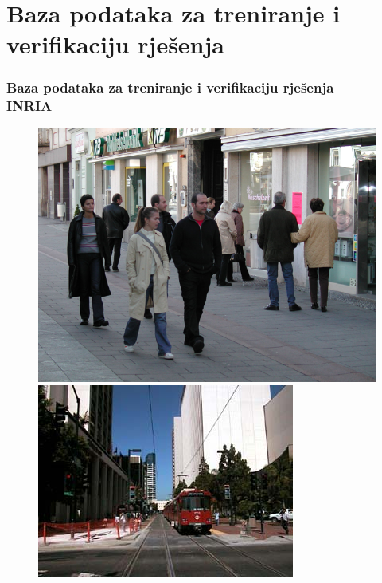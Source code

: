 \documentclass{beamer}
\begin{document}
\section{Baza podataka za treniranje i verifikaciju rješenja }
\begin{frame}
\frametitle{Baza podataka za treniranje i verifikaciju rješenja \\ INRIA \cite{Dollar:2012:PDE:2197081.2197275}}

\begin{figure}
\includegraphics{img/person_139.png}
\includegraphics[scale=0.3]{img/neg.png}
\end{figure}
\begin{figure}

\end{figure}
\end{frame}
\end{document}
